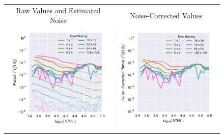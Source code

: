 \documentclass[preprint]{aastex}
\begin{document}
\newcommand\median{\ensuremath{\operatorname{median}}}
\begin{figure}
  \centering
  \begin{tabular}{@{}c@{}c@{}}
    Raw Values and Estimated Noise & Noise-Corrected Values \\ 
    \includegraphics{muse-tsq-robust-vs-bright-N_II}
    & \includegraphics{muse-corrected-tsq-robust-vs-bright-N_II} \\

\end{tabular}
\end{figure}
\end{document}

